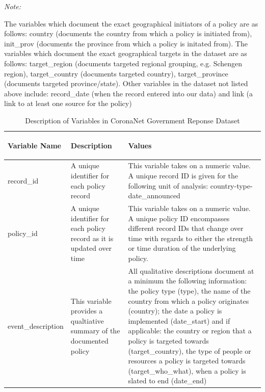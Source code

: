 \documentclass[]{article}
\begin{document}
\begingroup\fontsize{10}{12}\selectfont

\begin{ThreePartTable}
\begin{TableNotes}[para]
\small
\item \textit{Note: } 
\item *The variables which document the exact geographical initiators of a policy are as follows:  country (documents the country from which a policy is initiated from), init\_prov (documents the province from which a policy is initated from). The variables which document the exact geographical targets in the dataset are as follows: target\_region (documents targeted regional grouping, e.g. Schengen region), target\_country (documents targeted country), target\_province (documents targeted province/state). Other variables in the dataset not listed above include: record\_date (when the record entered into our data) and link (a link to at least one source for the policy)
\end{TableNotes}
\begin{longtable}{>{\bfseries\raggedright\arraybackslash}p{3.5cm}>{\raggedright\arraybackslash}p{5cm}>{\raggedright\arraybackslash}p{8.5cm}}
\caption{\label{tab:vardesc}Description of Variables in CoronaNet Government Reponse Dataset}\\
\toprule
\textbf{Variable Name} & \textbf{Description} & \textbf{Values}\\
\midrule
\rowcolor{gray!6}  record\_id & A unique identifier for each policy record & This variable takes on a numeric value. A unique record ID is given for the following unit of analysis: country-type-date\_announced\\
policy\_id & A unique identifier for each policy record as it is updated over time & This variable takes on a numeric value. A unique policy ID encompasses different record IDs that change over time with regards to either the strength or time duration of the underlying policy.\\
\rowcolor{gray!6}  event\_description & This variable provides a qualtiative summary of the documented policy & All qualitative descriptions document at a minimum the following information: the policy type (type), the name of the country from which a policy originates (country); the date a policy is implemented (date\_start) and if applicable:  the country or region that a policy is targeted towards (target\_country), the type of people or resources a policy is targeted towards (target\_who\_what), when a policy is slated to end (date\_end)\\

\end{longtable}
\end{ThreePartTable}
\end{document}
